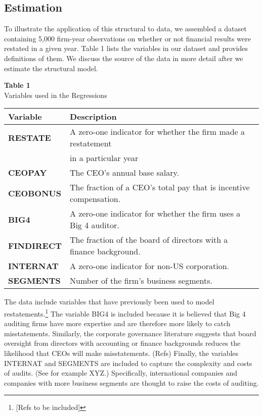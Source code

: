 \documentclass[14pt]{article}
\newcommand\T{\rule[0em]{0pt}{1.5em}}       %
\newcommand\B{\rule[-1em]{0pt}{0pt}} %
\begin{document}
\subsection{Estimation}

To illustrate the application of this structural to data, we assembled a dataset containing 
5,000 firm-year observations on whether or not financial results were restated in a given year.
Table 1 lists the variables in our dataset and provides definitions of them. 
We discuss the source of the data in more detail after we estimate the structural model. 

\begin{table}[t]
\begin{center}
{\bf Table 1} \\
Variables used in the Regressions \\[1em]
\begin{tabular}{|l|l|}
\hline
\T {\bf Variable}  &  {\bf Description}   \\ \hline
\T {\bf RESTATE} & A zero-one indicator for whether the firm made a restatement\\
   & \qquad in a particular year \\[.3em]
{\bf CEOPAY} & The CEO's annual base salary.  \\[.3em]
{\bf CEOBONUS} & The fraction of a CEO's total pay that is incentive compensation.   \\[.3em]
{\bf BIG4} & A zero-one indicator for whether the firm uses a Big 4 auditor. \\[.3em]
{\bf FINDIRECT} & The fraction of the board of directors with a finance background.  \\[.3em]
{\bf INTERNAT} &  A zero-one indicator for non-US corporation.  \\[.3em]
\B {\bf SEGMENTS} & Number of the firm's business segments. \\
\hline
\end{tabular}
\end{center}
\end{table}

\vglue 10pt
The data include variables that have previously been used to model restatements.\footnote{[Refs to be included]} The variable BIG4 is included 
because it is believed that Big 4 auditing firms have more expertise and are therefore more likely
to catch misstatements. Similarly, the corporate governance literature suggests that board oversight 
from directors with accounting or finance backgrounds reduces the likelihood that CEOs will 
make misstatements. (Refs) Finally, the variables INTERNAT and 
SEGMENTS are included to capture the complexity and costs of audits. (See for example
XYZ.) Specifically, international companies and companies with more business segments are 
thought to raise the costs of auditing. 
\end{document}
